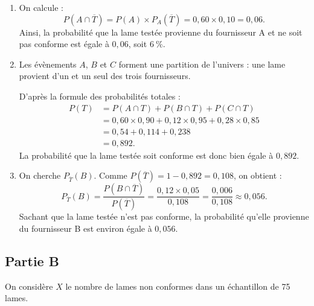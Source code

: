 \documentclass[10pt]{article}
\begin{document}
\begin{enumerate}
	\item On calcule :
	\[
	P\left(A\cap\overline T\right)=P(A)\times P_A(\overline T)=0,60\times 0,10=0,06.
	\]
	Ainsi, la probabilité que la lame testée provienne du fournisseur A et ne soit pas conforme est égale à $0,06$, soit $6~\%$.

	\item Les évènements $A$, $B$ et $C$ forment une partition de l'univers : une lame provient d'un et un seul des trois fournisseurs.

	D'après la formule des probabilités totales :
	\[
	\begin{aligned}
	P(T)&=P(A\cap T)+P(B\cap T)+P(C\cap T)\\
	&=0,60\times 0,90+0,12\times 0,95+0,28\times 0,85\\
	&=0,54+0,114+0,238\\
	&=0,892.
	\end{aligned}
	\]
	La probabilité que la lame testée soit conforme est donc bien égale à $0,892$.

	\item On cherche $P_{\overline T}(B)$.
	Comme $P(\overline T)=1-0,892=0,108$, on obtient :
	\[
	P_{\overline T}(B)=\dfrac{P(B\cap\overline T)}{P(\overline T)}
	=\dfrac{0,12\times 0,05}{0,108}
	=\dfrac{0,006}{0,108}
	\approx 0,056.
	\]
	Sachant que la lame testée n'est pas conforme, la probabilité qu'elle provienne du fournisseur B est environ égale à $0,056$.
\end{enumerate}

\subsection*{Partie B}

On considère $X$ le nombre de lames non conformes dans un échantillon de 75 lames.
\end{document}

